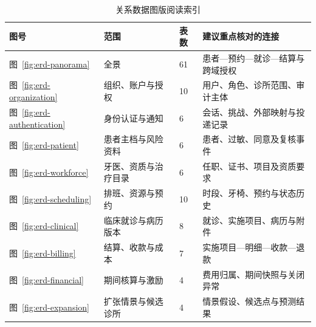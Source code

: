 \documentclass[12pt,a4paper,fontset=windows]{ctexart}
\begin{document}
\begin{table}[H]\centering\small
\caption{关系数据图版阅读索引}\label{tab:erd-plates}
\begin{tabular}{@{}C{13mm}L{50mm}C{16mm}L{66mm}@{}}\toprule
图号 & 范围 & 表数 & 建议重点核对的连接\\\midrule
图~\ref{fig:erd-panorama} & 全景 & 61 & 患者—预约—就诊—结算与跨域授权\\
图~\ref{fig:erd-organization} & 组织、账户与授权 & 10 & 用户、角色、诊所范围、审计主体\\
图~\ref{fig:erd-authentication} & 身份认证与通知 & 6 & 会话、挑战、外部映射与投递记录\\
图~\ref{fig:erd-patient} & 患者主档与风险资料 & 6 & 患者、过敏、同意及复核事件\\
图~\ref{fig:erd-workforce} & 牙医、资质与治疗目录 & 6 & 任职、证书、项目及资质要求\\
图~\ref{fig:erd-scheduling} & 排班、资源与预约 & 10 & 时段、牙椅、预约与状态历史\\
图~\ref{fig:erd-clinical} & 临床就诊与病历版本 & 8 & 就诊、实施项目、病历与附件\\
图~\ref{fig:erd-billing} & 结算、收款与成本 & 7 & 实施项目—明细—收款—退款\\
图~\ref{fig:erd-financial} & 期间核算与激励 & 4 & 费用归属、期间快照与关闭异常\\
图~\ref{fig:erd-expansion} & 扩张情景与候选诊所 & 4 & 情景假设、候选点与预测结果\\
\bottomrule\end{tabular}\end{table}
\end{document}
